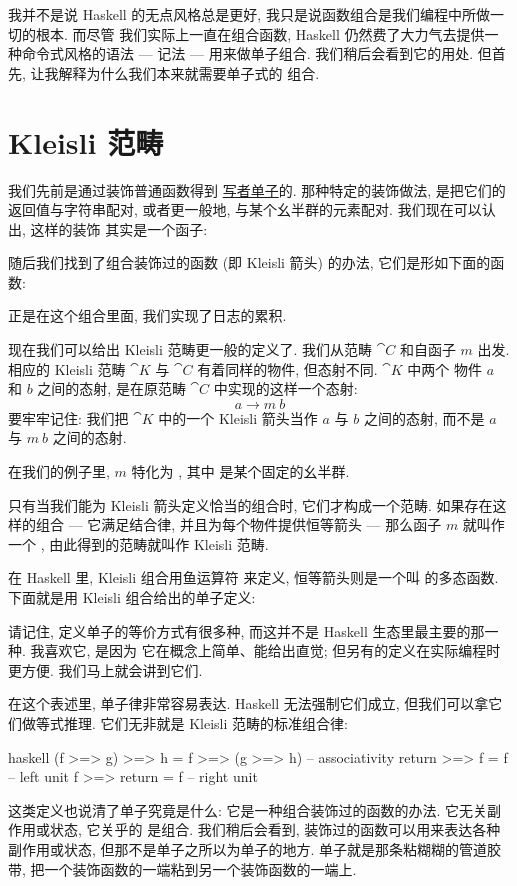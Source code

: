 我并不是说 Haskell 的无点风格总是更好, 我只是说函数组合是我们编程中所做一切的根本. 而尽管
我们实际上一直在组合函数, Haskell 仍然费了大力气去提供一种命令式风格的语法 --- 
记法 --- 用来做单子组合. 我们稍后会看到它的用处. 但首先, 让我解释为什么我们本来就需要单子式的
组合.

\section{Kleisli 范畴}

我们先前是通过装饰普通函数得到 \hyperref[kleisli-categories]{写者单子}的. 那种特定的装饰做法,
是把它们的返回值与字符串配对, 或者更一般地, 与某个幺半群的元素配对. 我们现在可以认出, 这样的装饰
其实是一个函子:

随后我们找到了组合装饰过的函数 (即 Kleisli 箭头) 的办法, 它们是形如下面的函数:

正是在这个组合里面, 我们实现了日志的累积.

现在我们可以给出 Kleisli 范畴更一般的定义了. 我们从范畴 $\cat{C}$ 和自函子 $m$ 出发.
相应的 Kleisli 范畴 $\cat{K}$ 与 $\cat{C}$ 有着同样的物件, 但态射不同. $\cat{K}$ 中两个
物件 $a$ 和 $b$ 之间的态射, 是在原范畴 $\cat{C}$ 中实现的这样一个态射:
\[a \to m\ b\]
要牢牢记住: 我们把 $\cat{K}$ 中的一个 Kleisli 箭头当作 $a$ 与 $b$ 之间的态射, 而不是
$a$ 与 $m\ b$ 之间的态射.

在我们的例子里, $m$ 特化为 , 其中  是某个固定的幺半群.

只有当我们能为 Kleisli 箭头定义恰当的组合时, 它们才构成一个范畴. 如果存在这样的组合 ---
它满足结合律, 并且为每个物件提供恒等箭头 --- 那么函子 $m$ 就叫作一个 ,
由此得到的范畴就叫作 Kleisli 范畴.

在 Haskell 里, Kleisli 组合用鱼运算符 \code{>=>} 来定义, 恒等箭头则是一个叫 
的多态函数. 下面就是用 Kleisli 组合给出的单子定义:

请记住, 定义单子的等价方式有很多种, 而这并不是 Haskell 生态里最主要的那一种. 我喜欢它, 是因为
它在概念上简单、能给出直觉; 但另有的定义在实际编程时更方便. 我们马上就会讲到它们.

在这个表述里, 单子律非常容易表达. Haskell 无法强制它们成立, 但我们可以拿它们做等式推理.
它们无非就是 Kleisli 范畴的标准组合律:

\begin{snip}{haskell}
(f >=> g) >=> h = f >=> (g >=> h) -- associativity
return >=> f = f                  -- left unit
f >=> return = f                  -- right unit
\end{snip}
这类定义也说清了单子究竟是什么: 它是一种组合装饰过的函数的办法. 它无关副作用或状态, 它关乎的
是组合. 我们稍后会看到, 装饰过的函数可以用来表达各种副作用或状态, 但那不是单子之所以为单子的地方.
单子就是那条粘糊糊的管道胶带, 把一个装饰函数的一端粘到另一个装饰函数的一端上.

